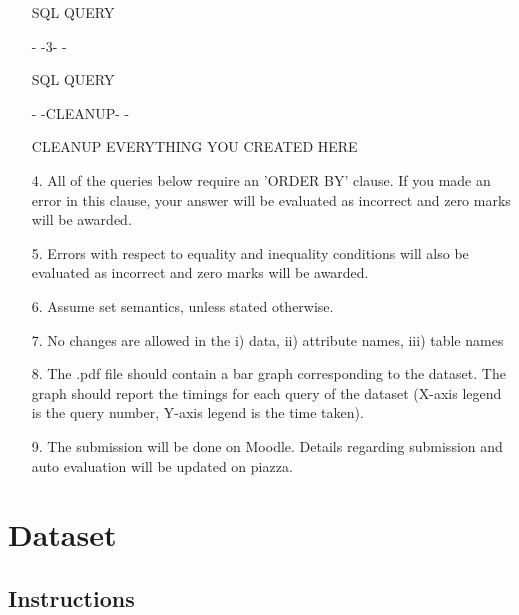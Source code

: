 \documentclass[10pt]{article}
\begin{document}
\begin{itemize}
SQL QUERY

- -3- -

SQL QUERY

- -CLEANUP- -

CLEANUP EVERYTHING YOU CREATED HERE

\item[4.] All of the queries below require an 'ORDER BY' clause. If you made an error in this clause, your answer will be evaluated as incorrect and zero marks will be awarded. 

\item[5.] Errors with respect to equality and inequality conditions will also be evaluated as incorrect and zero marks will be awarded. 

\item[6.] Assume set semantics, unless stated otherwise.

\item[7.] No changes are allowed in the i) data, ii) attribute names, iii) table names

\item[8.] The .pdf file should contain a bar graph corresponding to the dataset. The graph should report the timings for each query of the dataset (X-axis legend is the query number, Y-axis legend is the time taken).

\item[9.] The submission will be done on Moodle. Details regarding submission and auto evaluation will be updated on piazza.
\end{itemize}
\section{Dataset}

\subsection{Instructions}
\end{document}
